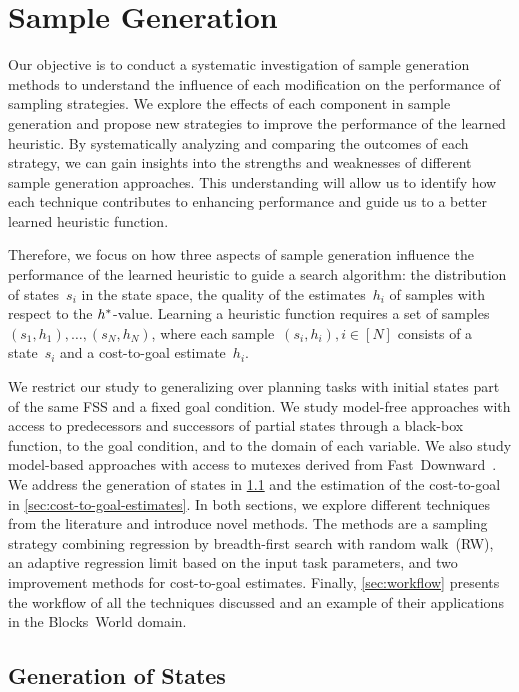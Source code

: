 \chapter{Sample Generation}
\label{sec:sampling}

Our objective is to conduct a systematic investigation of sample generation methods to understand the influence of each modification on the performance of sampling strategies. We explore the effects of each component in sample generation and propose new strategies to improve the performance of the learned heuristic. By systematically analyzing and comparing the outcomes of each strategy, we can gain insights into the strengths and weaknesses of different sample generation approaches. This understanding will allow us to identify how each technique contributes to enhancing performance and guide us to a better learned heuristic function.

Therefore, we focus on how three aspects of sample generation influence the performance of the learned heuristic to guide a search algorithm: the distribution of states~$s_i$ in the state space, the quality of the estimates~$h_i$ of samples with respect to the $h^{*}$-value. Learning a heuristic function requires a set of samples~$(s_1,h_1),\ldots,(s_N,h_N)$, where each sample~$(s_i,h_i), i\in[N]$ consists of a state~$s_i$ and a cost-to-goal estimate~$h_i$.

We restrict our study to generalizing over planning tasks with initial states part of the same FSS and a fixed goal condition. We study model-free approaches with access to predecessors and successors of partial states through a black-box function, to the goal condition, and to the domain of each variable. We also study model-based approaches with access to mutexes derived from Fast~Downward~\cite{helmert2006fast}. We address the generation of states in \cref{sec:state-generation} and the estimation of the cost-to-goal in \cref{sec:cost-to-goal-estimates}. In both sections, we explore different techniques from the literature and introduce novel methods. The methods are a sampling strategy combining regression by breadth-first search with random walk~(RW), an adaptive regression limit based on the input task parameters, and two improvement methods for cost-to-goal estimates. Finally, \cref{sec:workflow} presents the workflow of all the techniques discussed and an example of their applications in the Blocks~World domain.

\section{Generation of States}
\label{sec:state-generation}

